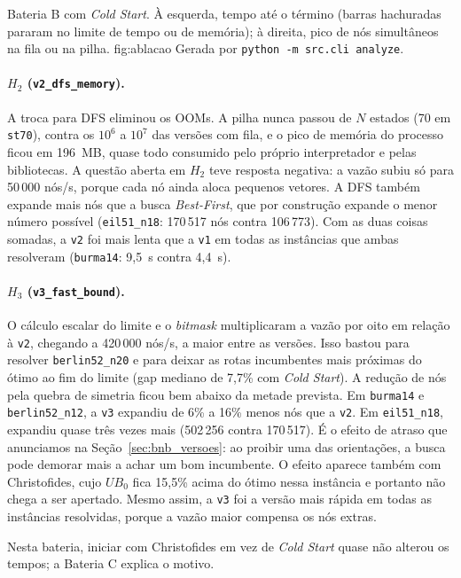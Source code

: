 {Bateria B com \textit{Cold Start}. À esquerda, tempo até o término (barras hachuradas pararam
no limite de tempo ou de memória); à direita, pico de nós simultâneos na fila ou na pilha.}
{fig:ablacao}
{Gerada por \texttt{python -m src.cli analyze}.}

\paragraph{$H_2$ (\texttt{v2\_dfs\_memory}).}
A troca para DFS eliminou os OOMs. A pilha nunca passou de $N$ estados (70 em \texttt{st70}),
contra os $10^6$ a $10^7$ das versões com fila, e o pico de memória do processo ficou em
196~MB, quase todo consumido pelo próprio interpretador e pelas bibliotecas. A questão aberta
em $H_2$ teve resposta negativa: a vazão subiu só para 50\,000 nós/s, porque cada nó ainda
aloca pequenos vetores. A DFS também expande mais nós que a busca \textit{Best-First}, que por
construção expande o menor número possível (\texttt{eil51\_n18}: 170\,517 nós contra
106\,773). Com as duas coisas somadas, a \texttt{v2} foi mais lenta que a \texttt{v1} em todas
as instâncias que ambas resolveram (\texttt{burma14}: 9,5~s contra 4,4~s).

\paragraph{$H_3$ (\texttt{v3\_fast\_bound}).}
O cálculo escalar do limite e o \textit{bitmask} multiplicaram a vazão por oito em relação à
\texttt{v2}, chegando a 420\,000 nós/s, a maior entre as versões. Isso bastou para resolver
\texttt{berlin52\_n20} e para deixar as rotas incumbentes mais próximas do ótimo ao fim do
limite (gap mediano de 7,7\% com \textit{Cold Start}). A redução de nós pela quebra de simetria
ficou bem abaixo da metade prevista. Em \texttt{burma14} e \texttt{berlin52\_n12}, a
\texttt{v3} expandiu de 6\% a 16\% menos nós que a \texttt{v2}. Em \texttt{eil51\_n18}, expandiu
quase três vezes mais (502\,256 contra 170\,517). É o efeito de atraso que anunciamos na
Seção~\ref{sec:bnb_versoes}: ao proibir uma das orientações, a busca pode demorar mais a achar
um bom incumbente. O efeito aparece também com Christofides, cujo $UB_0$ fica 15,5\% acima do
ótimo nessa instância e portanto não chega a ser apertado. Mesmo assim, a \texttt{v3} foi a
versão mais rápida em todas as instâncias resolvidas, porque a vazão maior compensa os nós
extras.

Nesta bateria, iniciar com Christofides em vez de \textit{Cold Start} quase não alterou os
tempos; a Bateria C explica o motivo.

